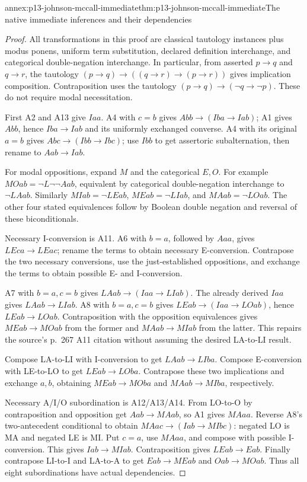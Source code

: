 \begin{annexitem}{annex:p13-johnson-mccall-immediate}{thm:p13-johnson-mccall-immediate}{The native immediate inferences and their dependencies}
\begin{proof}
All transformations in this proof are classical tautology instances plus
modus ponens, uniform term substitution, declared definition interchange,
and categorical double-negation interchange. In particular, from asserted
\(p\to q\) and \(q\to r\), the tautology
\((p\to q)\to((q\to r)\to(p\to r))\) gives implication composition.
Contraposition uses the tautology \((p\to q)\to(\neg q\to\neg p)\).
These do not require modal necessitation.

First A2 and A13 give \(Iaa\). A4 with \(c=b\) gives
\(Abb\to(Iba\to Iab)\); A1 gives \(Abb\), hence \(Iba\to Iab\)
and its uniformly exchanged converse. A4 with its original \(a=b\)
gives \(Abc\to(Ibb\to Ibc)\); use \(Ibb\) to get assertoric
subalternation, then rename to \(Aab\to Iab\).

For modal oppositions, expand \(M\) and the categorical \(E,O\).
For example \(MOab=\neg L\neg\neg Aab\), equivalent by categorical
double-negation interchange to \(\neg LAab\). Similarly
\(MIab=\neg LEab\), \(MEab=\neg LIab\), and
\(MAab=\neg LOab\). The other four stated equivalences follow by
Boolean double negation and reversal of these biconditionals.

Necessary I-conversion is A11. A6 with \(b=a\), followed by \(Aaa\),
gives \(LEca\to LEac\); rename the terms to obtain necessary E-conversion.
Contrapose the two necessary conversions, use the just-established
oppositions, and exchange the terms to obtain possible E- and I-conversion.

A7 with \(b=a,c=b\) gives \(LAab\to(Iaa\to LIab)\).
The already derived \(Iaa\) gives \(LAab\to LIab\).
A8 with \(b=a,c=b\) gives \(LEab\to(Iaa\to LOab)\), hence
\(LEab\to LOab\). Contraposition with the opposition equivalences
gives \(MEab\to MOab\) from the former and \(MAab\to MIab\)
from the latter. This repairs the source's p.~267 A11 citation without
assuming the desired LA-to-LI result.

Compose LA-to-LI with I-conversion to get \(LAab\to LIba\).
Compose E-conversion with LE-to-LO to get \(LEab\to LOba\).
Contrapose these two implications and exchange \(a,b\), obtaining
\(MEab\to MOba\) and \(MAab\to MIba\), respectively.

Necessary A/I/O subordination is A12/A13/A14. From LO-to-O by
contraposition and opposition get \(Aab\to MAab\), so A1 gives
\(MAaa\). Reverse A8's two-antecedent conditional to obtain
\(MAac\to(Iab\to MIbc)\): negated LO is MA and negated LE is MI.
Put \(c=a\), use \(MAaa\), and compose with possible I-conversion.
This gives \(Iab\to MIab\). Contraposition gives \(LEab\to Eab\).
Finally contrapose LI-to-I and LA-to-A to get \(Eab\to MEab\) and
\(Oab\to MOab\). Thus all eight subordinations have actual dependencies.
\end{proof}
\end{annexitem}


